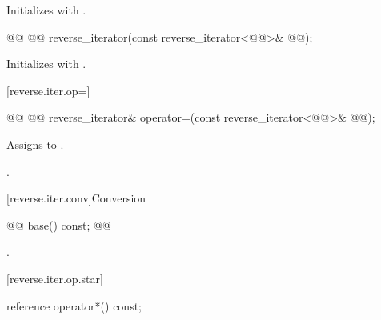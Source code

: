 \begin{itemdescr}
\pnum
\effects
Initializes
with .
\end{itemdescr}

%

\begin{itemdecl}
@@
  @@
reverse_iterator(const reverse_iterator<@@>& @@);
\end{itemdecl}

\begin{itemdescr}
\pnum
\effects
Initializes
with
.
\end{itemdescr}

[reverse.iter.op=]{}

%
\begin{itemdecl}
@@
  @@
reverse_iterator&
  operator=(const reverse_iterator<@@>& @@);
\end{itemdecl}

\begin{itemdescr}
\pnum
\effects
Assigns  to .

\pnum
\returns
{}.
\end{itemdescr}

[reverse.iter.conv]{Conversion}

%
%
\begin{itemdecl}
@@ base() const;          @@
\end{itemdecl}

\begin{itemdescr}
\pnum
\returns
{}.
\end{itemdescr}

[reverse.iter.op.star]{}

%
\begin{itemdecl}
reference operator*() const;
\end{itemdecl}

